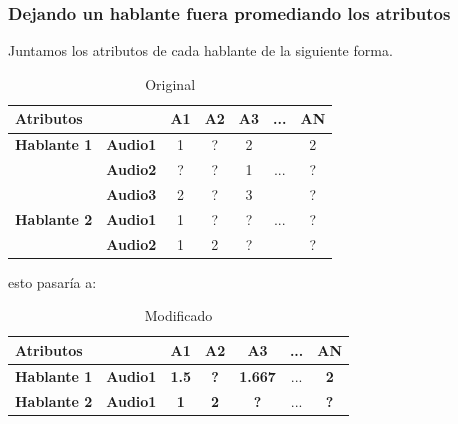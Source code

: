 \documentclass[mathserif]{beamer}%
\begin{document}
\begin{frame}
	\frametitle{Dejando un hablante fuera promediando los atributos}
	
	Juntamos los atributos de cada hablante de la siguiente forma.
	
	\begin{table}[H]
		\centering
		\resizebox{7cm}{!} {
		\begin{tabular}{|l|l|ccccc|}
			\hline
			\multicolumn{2}{|l|}{Atributos} & A1 & A2 & A3 & ... & AN \\
			\hline 
			\textbf{Hablante 1} & \textbf{Audio1} & 1 & ? & 2 & & 2\\
			& \textbf{Audio2} & ? & ? & 1 & ... & ? \\
			& \textbf{Audio3} & 2 & ? & 3 & & ? \\
			\hline
			\textbf{Hablante 2} & \textbf{Audio1} & 1 & ? & ? & ... & ? \\
			& \textbf{Audio2} & 1 & 2 & ? & & ? \\
			\hline
		\end{tabular}
		}
		\caption{Original}
		\label{}
	\end{table}
	
	esto pasaría a:
	
	\begin{table}[H]
		\centering
		\resizebox{7cm}{!} {
		\begin{tabular}{|l|l|ccccc|}
			\hline
			\multicolumn{2}{|l|}{Atributos} & A1 & A2 & A3 & ... & AN \\
			\hline 
			\textbf{Hablante 1} & \textbf{Audio1} & \textbf{1.5} & \textbf{?} & \textbf{1.667} & ... & \textbf{2}\\
			\hline
			\textbf{Hablante 2} & \textbf{Audio1} & \textbf{1} & \textbf{2} & \textbf{?} & ... & \textbf{?} \\
			\hline
		\end{tabular}
		}
		\caption{Modificado}
		\label{}
	\end{table}
\end{frame}
\end{document}
